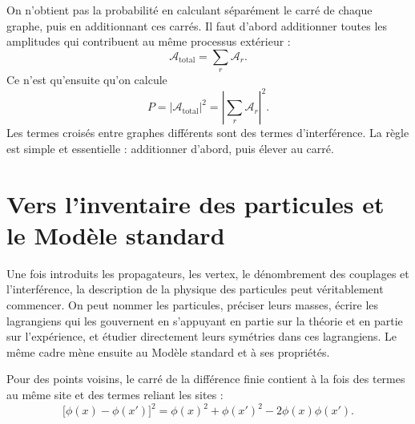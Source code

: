 On n’obtient pas la probabilité en calculant séparément le carré de chaque graphe, puis en additionnant ces carrés. Il faut d’abord additionner toutes les amplitudes qui contribuent au même processus extérieur :
\begin{equation}
\mathcal{A}_{\mathrm{total}}=\sum_r\mathcal{A}_r.
\end{equation}
Ce n’est qu’ensuite qu’on calcule
\begin{equation}
P=\left|\mathcal{A}_{\mathrm{total}}\right|^2
=\left|\sum_r\mathcal{A}_r\right|^2.
\end{equation}
Les termes croisés entre graphes différents sont des termes d’interférence. La règle est simple et essentielle : additionner d’abord, puis élever au carré.

\section{Vers l’inventaire des particules et le Modèle standard}

Une fois introduits les propagateurs, les vertex, le dénombrement des couplages et l’interférence, la description de la physique des particules peut véritablement commencer. On peut nommer les particules, préciser leurs masses, écrire les lagrangiens qui les gouvernent en s’appuyant en partie sur la théorie et en partie sur l’expérience, et étudier directement leurs symétries dans ces lagrangiens. Le même cadre mène ensuite au Modèle standard et à ses propriétés.

\begin{classroomqa}
\end{classroomqa}

\begin{classroomqa}
\end{classroomqa}

Pour des points voisins, le carré de la différence finie contient à la fois des termes au même site et des termes reliant les sites :
\begin{equation}
\bigl[\phi(x)-\phi(x')\bigr]^2
=
\phi(x)^2+\phi(x')^2-2\phi(x)\phi(x').
\end{equation}

\begin{classroomqa}
\end{classroomqa}
